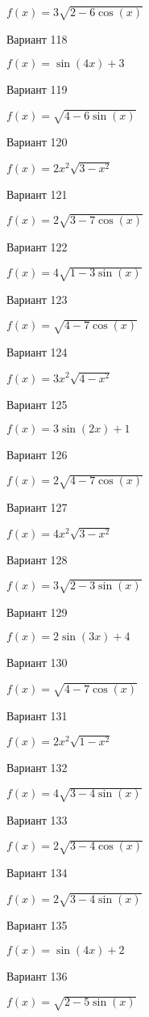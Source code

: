 \documentclass[11pt]{report}
\begin{document}
$f(x) = 3 \sqrt{2 - 6 \cos{\left(x \right)}}$

Вариант 118

$f(x) = \sin{\left(4 x \right)} + 3$

Вариант 119

$f(x) = \sqrt{4 - 6 \sin{\left(x \right)}}$

Вариант 120

$f(x) = 2 x^{2} \sqrt{3 - x^{2}}$

Вариант 121

$f(x) = 2 \sqrt{3 - 7 \cos{\left(x \right)}}$

Вариант 122

$f(x) = 4 \sqrt{1 - 3 \sin{\left(x \right)}}$

Вариант 123

$f(x) = \sqrt{4 - 7 \cos{\left(x \right)}}$

Вариант 124

$f(x) = 3 x^{2} \sqrt{4 - x^{2}}$

Вариант 125

$f(x) = 3 \sin{\left(2 x \right)} + 1$

Вариант 126

$f(x) = 2 \sqrt{4 - 7 \cos{\left(x \right)}}$

Вариант 127

$f(x) = 4 x^{2} \sqrt{3 - x^{2}}$

Вариант 128

$f(x) = 3 \sqrt{2 - 3 \sin{\left(x \right)}}$

Вариант 129

$f(x) = 2 \sin{\left(3 x \right)} + 4$

Вариант 130

$f(x) = \sqrt{4 - 7 \cos{\left(x \right)}}$

Вариант 131

$f(x) = 2 x^{2} \sqrt{1 - x^{2}}$

Вариант 132

$f(x) = 4 \sqrt{3 - 4 \sin{\left(x \right)}}$

Вариант 133

$f(x) = 2 \sqrt{3 - 4 \cos{\left(x \right)}}$

Вариант 134

$f(x) = 2 \sqrt{3 - 4 \sin{\left(x \right)}}$

Вариант 135

$f(x) = \sin{\left(4 x \right)} + 2$

Вариант 136

$f(x) = \sqrt{2 - 5 \sin{\left(x \right)}}$
\end{document}
